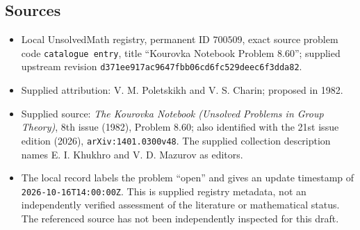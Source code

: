 \documentclass[11pt]{article}
\begin{document}
\subsection{Sources}
\begin{itemize}
\item Local UnsolvedMath registry, permanent ID \(700509\), exact source problem code \texttt{catalogue entry}, title ``Kourovka Notebook Problem 8.60''; supplied upstream revision \texttt{d371ee917ac9647fbb06cd6fc529deec6f3dda82}.
\item Supplied attribution: V. M. Poletskikh and V. S. Charin; proposed in 1982.
\item Supplied source: \emph{The Kourovka Notebook (Unsolved Problems in Group Theory)}, 8th issue (1982), Problem 8.60; also identified with the 21st issue edition (2026), \texttt{arXiv:1401.0300v48}. The supplied collection description names E. I. Khukhro and V. D. Mazurov as editors.
\item The local record labels the problem ``open'' and gives an update timestamp of \texttt{2026-10-16T14:00:00Z}. This is supplied registry metadata, not an independently verified assessment of the literature or mathematical status. The referenced source has not been independently inspected for this draft.
\end{itemize}
\end{document}
